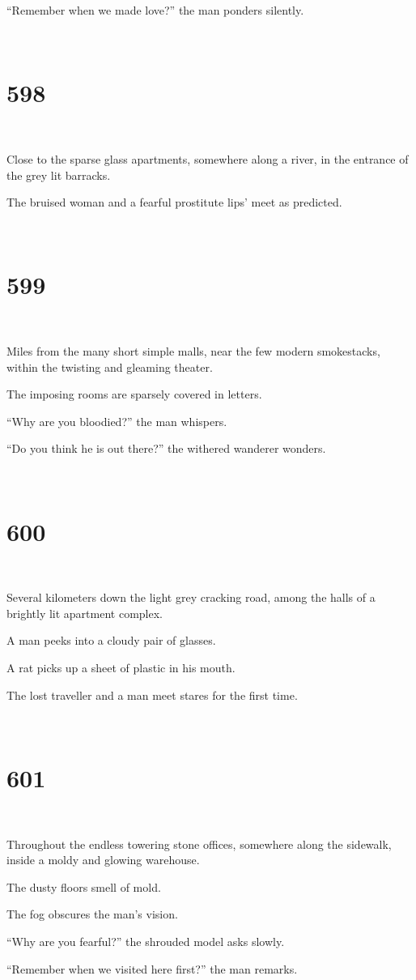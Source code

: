 \documentclass{report}
\begin{document}
``Remember when we made love?'' the man ponders silently.

~
\chapter*{598}
~

Close to the sparse glass apartments, somewhere along a river, in the entrance of the grey lit barracks.

The bruised woman and a fearful prostitute lips' meet as predicted.

~
\chapter*{599}
~

Miles from the many short simple malls, near the few modern smokestacks, within the twisting and gleaming theater.

The imposing rooms are sparsely covered in letters.

``Why are you bloodied?'' the man whispers.

``Do you think he is out there?'' the withered wanderer wonders.

~
\chapter*{600}
~

Several kilometers down the light grey cracking road, among the halls of a brightly lit apartment complex.

A man peeks into a cloudy pair of glasses.

A rat picks up a sheet of plastic in his mouth.

The lost traveller and a man meet stares for the first time.

~
\chapter*{601}
~

Throughout the endless towering stone offices, somewhere along the sidewalk, inside a moldy and glowing warehouse.

The dusty floors smell of mold.

The fog obscures the man's vision.

``Why are you fearful?'' the shrouded model asks slowly.

``Remember when we visited here first?'' the man remarks.

~
\end{document}
